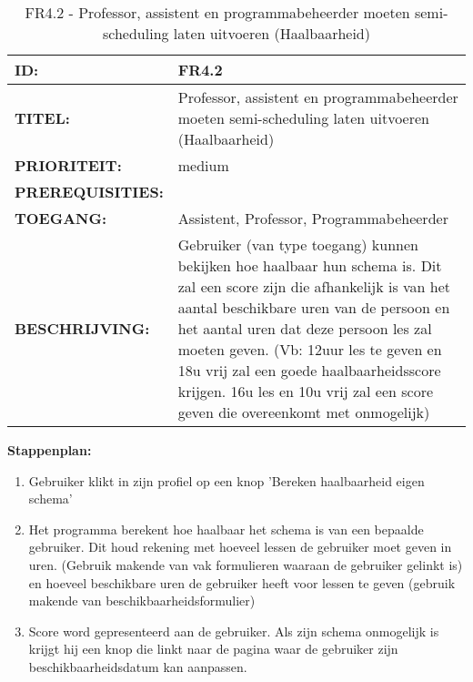 \noindent\begin{table}[H]
	\begin{tabular}{l | p{10cm}}
    \textbf{ID:} & FR4.2 \\ \hline
    \textbf{TITEL:} & Professor, assistent en programmabeheerder moeten semi-scheduling laten uitvoeren (Haalbaarheid)\\ \hline
    \textbf{PRIORITEIT:} &  medium \\ \hline
    \textbf{PREREQUISITIES:} & \\ \hline
    \textbf{TOEGANG:} & Assistent, Professor, Programmabeheerder \\ \hline
    \textbf{BESCHRIJVING:} & Gebruiker (van type toegang) kunnen bekijken hoe haalbaar hun schema is. Dit zal een score zijn die afhankelijk is van het aantal beschikbare uren van de persoon en het aantal uren dat deze persoon les zal moeten geven. (Vb: 12uur les te geven en 18u vrij zal een goede haalbaarheidsscore krijgen. 16u les en 10u vrij zal een score geven die overeenkomt met onmogelijk)\\
    \end{tabular}
    \caption{FR4.2 - Professor, assistent en programmabeheerder moeten semi-scheduling laten uitvoeren (Haalbaarheid)}
    \label{tab:FR4.2 - Professor, assistent en programmabeheerder moeten semi-scheduling laten uitvoeren (Haalbaarheid)}
\end{table}

\textbf{Stappenplan:}
	\begin{enumerate}
	\item Gebruiker klikt in zijn profiel op een knop 'Bereken haalbaarheid eigen schema'
	\item Het programma berekent hoe haalbaar het schema is van een bepaalde gebruiker. Dit houd rekening met hoeveel lessen de gebruiker moet geven in uren. (Gebruik makende van vak formulieren waaraan de gebruiker gelinkt is) en hoeveel beschikbare uren de gebruiker heeft voor lessen te geven (gebruik makende van beschikbaarheidsformulier)
	\item Score word gepresenteerd aan de gebruiker. Als zijn schema onmogelijk is krijgt hij een knop die linkt naar de pagina waar de gebruiker zijn beschikbaarheidsdatum kan aanpassen.
	\end{enumerate}
        
        
        
